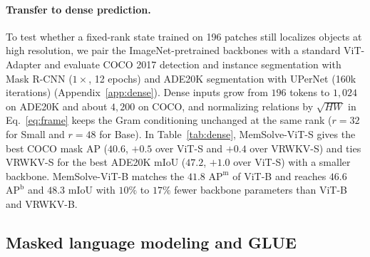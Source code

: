\documentclass[10pt,twocolumn]{article}
\begin{document}
\paragraph{Transfer to dense prediction.}
To test whether a fixed-rank state trained on 196 patches still localizes
objects at high resolution, we pair the ImageNet-pretrained backbones with a
standard ViT-Adapter
\cite{chen2023vitadapter,duan2025vrwkv} and evaluate COCO 2017 detection and
instance segmentation with Mask R-CNN ($1\times$, 12 epochs)
\cite{lin2014coco,he2017maskrcnn} and ADE20K segmentation with UPerNet (160k
iterations) \cite{zhou2017ade20k,xiao2018upernet} (Appendix~\ref{app:dense}).
Dense inputs grow from $196$ tokens to $1{,}024$ on ADE20K and about $4{,}200$
on COCO, and normalizing relations by $\sqrt{HW}$ in Eq.~\eqref{eq:frame}
keeps the Gram conditioning unchanged at the same rank ($r=32$ for Small and
$r=48$ for Base).
In Table~\ref{tab:dense}, MemSolve-ViT-S gives the best COCO mask AP ($40.6$,
$+0.5$ over ViT-S and $+0.4$ over VRWKV-S) and ties VRWKV-S for the best
ADE20K mIoU ($47.2$, $+1.0$ over ViT-S) with a smaller backbone.
MemSolve-ViT-B matches the $41.8$ $\text{AP}^{\text{m}}$ of ViT-B and reaches
$46.6$ $\text{AP}^{\text{b}}$ and $48.3$ mIoU with $10\%$ to $17\%$ fewer
backbone parameters than ViT-B and VRWKV-B.

\subsection{Masked language modeling and GLUE}
\label{sec:language}
\end{document}
